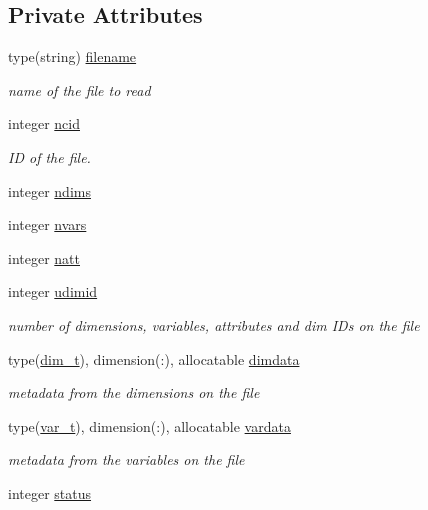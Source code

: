 \subsection*{Private Attributes}
\begin{DoxyCompactItemize}
\item 
type(string) \mbox{\hyperlink{structhdf5parser__mod_1_1hdf5file__class_ae59b5938c38fe6c76740a70082062b85}{filename}}
\begin{DoxyCompactList}\small\item\em name of the file to read \end{DoxyCompactList}\item 
integer \mbox{\hyperlink{structhdf5parser__mod_1_1hdf5file__class_af777516a319f0311090944b35118a279}{ncid}}
\begin{DoxyCompactList}\small\item\em ID of the file. \end{DoxyCompactList}\item 
integer \mbox{\hyperlink{structhdf5parser__mod_1_1hdf5file__class_aba62709bfb8b0c5327720d0e07a2eedb}{ndims}}
\item 
integer \mbox{\hyperlink{structhdf5parser__mod_1_1hdf5file__class_a2ca9fe45a4ab92a9f7168823656e84af}{nvars}}
\item 
integer \mbox{\hyperlink{structhdf5parser__mod_1_1hdf5file__class_a02480d9c4d0242456b4ea76eff71a0a3}{natt}}
\item 
integer \mbox{\hyperlink{structhdf5parser__mod_1_1hdf5file__class_a62e844de1bb39611ad7145ab658fc09e}{udimid}}
\begin{DoxyCompactList}\small\item\em number of dimensions, variables, attributes and dim I\+Ds on the file \end{DoxyCompactList}\item 
type(\mbox{\hyperlink{structhdf5parser__mod_1_1dim__t}{dim\+\_\+t}}), dimension(\+:), allocatable \mbox{\hyperlink{structhdf5parser__mod_1_1hdf5file__class_a3d699b7aea90d058126e7940973aef74}{dimdata}}
\begin{DoxyCompactList}\small\item\em metadata from the dimensions on the file \end{DoxyCompactList}\item 
type(\mbox{\hyperlink{structhdf5parser__mod_1_1var__t}{var\+\_\+t}}), dimension(\+:), allocatable \mbox{\hyperlink{structhdf5parser__mod_1_1hdf5file__class_a70efd0ed930593326b6d0d4383b519e6}{vardata}}
\begin{DoxyCompactList}\small\item\em metadata from the variables on the file \end{DoxyCompactList}\item 
integer \mbox{\hyperlink{structhdf5parser__mod_1_1hdf5file__class_a6f4df4cad2b66b6cb92c348df647c305}{status}}
\end{DoxyCompactItemize}


